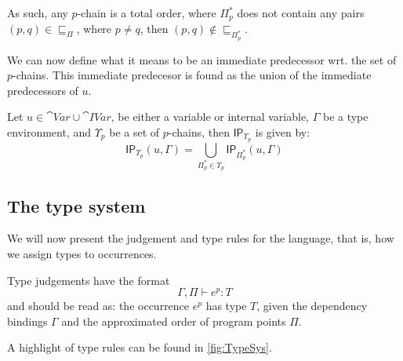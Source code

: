 \documentclass[acmsmall,sigplan]{acmart}
\newcommand{\uf}{\ensuremath{\mathsf{IP}}}
\begin{document}
As such, any $p$-chain is a total order, where $\Pi_p^{*}$ does not
contain any pairs $(p,q)\in\sqsubseteq_\Pi$, where $p\neq q$, then
$(p,q)\notin\sqsubseteq_{\Pi_p^{*}}$.

We can now define what it means to be an immediate predecessor
wrt. the set of $p$-chains. This immediate predecesor is found as the
union of the immediate predecessors of $u$.

\begin{definition}[]\label{def:GBindUps}
	Let $u\in \cat{Var}\cup\cat{IVar}$, be either a variable or internal variable, $\Gamma$ be a type environment, and $\Upsilon_p$ be a set of $p$-chains, then $\uf_{\Upsilon_p}$ is given by:
	$$\uf_{\Upsilon_p}(u,\Gamma)=\bigcup_{\Pi_p^{*}\in\Upsilon_p}\uf_{\Pi_p^{*}}(u,\Gamma)$$
\end{definition}



\subsection{The type system}\label{sec:Judge}
We will now present the judgement and type rules for the language, that is, how we assign types to occurrences.

Type judgements have the format
%
\[ \Gamma,\Pi\vdash e^p: T \]
%
and should be read as: the occurrence $e^p$ has type $T$, given the
dependency bindings $\Gamma$ and the approximated order of program
points $\Pi$. 

A highlight of type rules can be found in \cref{fig:TypeSys}.
\end{document}
